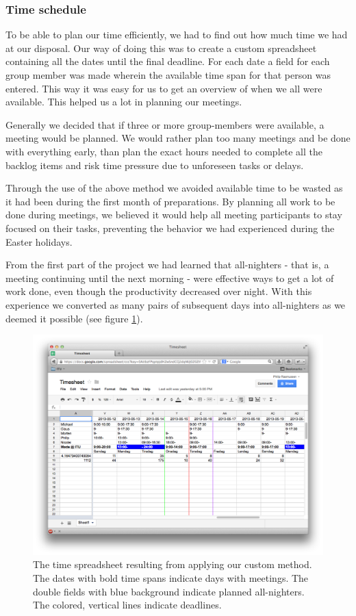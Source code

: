 \subsubsection{Time schedule}

To be able to plan our time efficiently, we had to find out how much time we had at our disposal. Our way of doing this was to create a custom spreadsheet containing all the dates until the final deadline.
For each date a field for each group member was made wherein the available time span for that person was entered. This way it was easy for us to get an overview of when we all were available. This helped us a lot in planning our meetings.

Generally we decided that if three or more group-members were available, a meeting would be planned. We would rather plan too many meetings and be done with everything early, than plan the exact hours needed to complete all the backlog items and risk time pressure due to unforeseen tasks or delays.

Through the use of the above method we avoided available time to be wasted as it had been during the first month of preparations. By planning all work to be done during meetings, we believed it would help all meeting participants to stay focused on their tasks, preventing the behavior we had experienced during the Easter holidays.

From the first part of the project we had learned that all-nighters - that is, a meeting continuing until the next morning - were effective ways to get a lot of work done, even though the productivity decreased over night. With this experience we converted as many pairs of subsequent days into all-nighters as we deemed it possible (see figure \ref{time_schedule}).

\begin{figure}[H]
  \includegraphics[width=\textwidth]{illustrations/partialTimeSheet}
  \caption{The time spreadsheet resulting from applying our custom method. The dates with bold time spans indicate days with meetings. The double fields with blue background indicate planned all-nighters. The colored, vertical lines indicate deadlines.}
  \label{time_schedule}
\end{figure}

